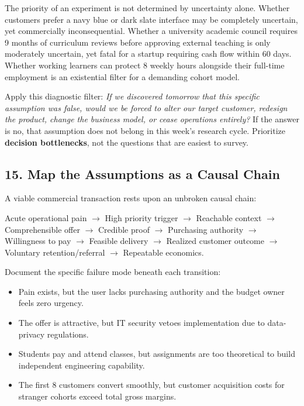 The priority of an experiment is not determined by uncertainty alone. Whether customers prefer a navy blue or dark slate interface may be completely uncertain, yet commercially inconsequential. Whether a university academic council requires 9 months of curriculum reviews before approving external teaching is only moderately uncertain, yet fatal for a startup requiring cash flow within 60 days. Whether working learners can protect 8 weekly hours alongside their full-time employment is an existential filter for a demanding cohort model.

Apply this diagnostic filter: \emph{If we discovered tomorrow that this specific assumption was false, would we be forced to alter our target customer, redesign the product, change the business model, or cease operations entirely?} If the answer is no, that assumption does not belong in this week's research cycle. Prioritize \textbf{decision bottlenecks}, not the questions that are easiest to survey.

\subsection*{15. Map the Assumptions as a Causal Chain}

A viable commercial transaction rests upon an unbroken causal chain:

\begin{center}
Acute operational pain $\rightarrow$ High priority trigger $\rightarrow$ Reachable context $\rightarrow$ Comprehensible offer $\rightarrow$ Credible proof $\rightarrow$ Purchasing authority $\rightarrow$ Willingness to pay $\rightarrow$ Feasible delivery $\rightarrow$ Realized customer outcome $\rightarrow$ Voluntary retention/referral $\rightarrow$ Repeatable economics.
\end{center}

Document the specific failure mode beneath each transition:
\begin{itemize}
    \item Pain exists, but the user lacks purchasing authority and the budget owner feels zero urgency.
    \item The offer is attractive, but IT security vetoes implementation due to data-privacy regulations.
    \item Students pay and attend classes, but assignments are too theoretical to build independent engineering capability.
    \item The first 8 customers convert smoothly, but customer acquisition costs for stranger cohorts exceed total gross margins.
\end{itemize}

